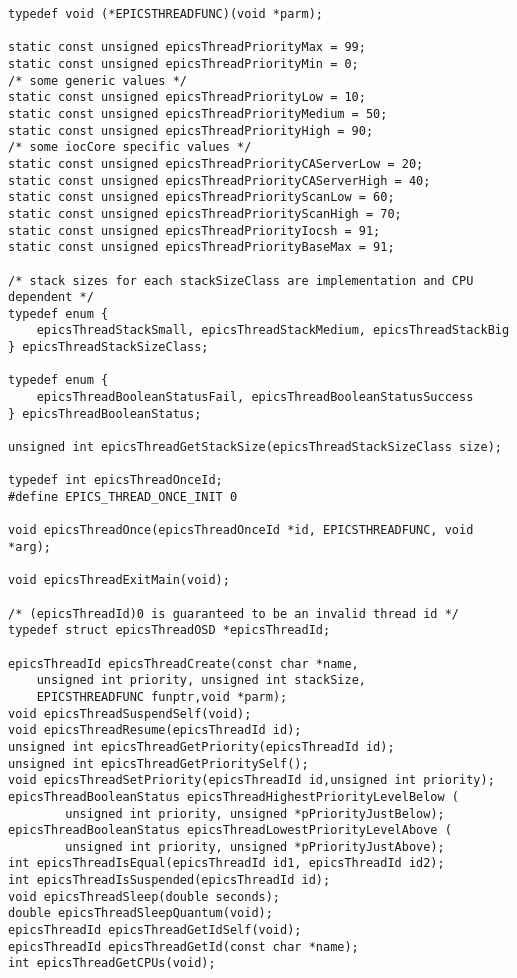 \begin{verbatim}
typedef void (*EPICSTHREADFUNC)(void *parm);

static const unsigned epicsThreadPriorityMax = 99;
static const unsigned epicsThreadPriorityMin = 0;
/* some generic values */
static const unsigned epicsThreadPriorityLow = 10;
static const unsigned epicsThreadPriorityMedium = 50;
static const unsigned epicsThreadPriorityHigh = 90;
/* some iocCore specific values */
static const unsigned epicsThreadPriorityCAServerLow = 20;
static const unsigned epicsThreadPriorityCAServerHigh = 40;
static const unsigned epicsThreadPriorityScanLow = 60;
static const unsigned epicsThreadPriorityScanHigh = 70;
static const unsigned epicsThreadPriorityIocsh = 91;
static const unsigned epicsThreadPriorityBaseMax = 91;

/* stack sizes for each stackSizeClass are implementation and CPU dependent */
typedef enum {
    epicsThreadStackSmall, epicsThreadStackMedium, epicsThreadStackBig
} epicsThreadStackSizeClass;

typedef enum {
    epicsThreadBooleanStatusFail, epicsThreadBooleanStatusSuccess
} epicsThreadBooleanStatus;

unsigned int epicsThreadGetStackSize(epicsThreadStackSizeClass size);

typedef int epicsThreadOnceId;
#define EPICS_THREAD_ONCE_INIT 0

void epicsThreadOnce(epicsThreadOnceId *id, EPICSTHREADFUNC, void *arg);

void epicsThreadExitMain(void);

/* (epicsThreadId)0 is guaranteed to be an invalid thread id */
typedef struct epicsThreadOSD *epicsThreadId;

epicsThreadId epicsThreadCreate(const char *name,
    unsigned int priority, unsigned int stackSize,
    EPICSTHREADFUNC funptr,void *parm);
void epicsThreadSuspendSelf(void);
void epicsThreadResume(epicsThreadId id);
unsigned int epicsThreadGetPriority(epicsThreadId id);
unsigned int epicsThreadGetPrioritySelf();
void epicsThreadSetPriority(epicsThreadId id,unsigned int priority);
epicsThreadBooleanStatus epicsThreadHighestPriorityLevelBelow (
        unsigned int priority, unsigned *pPriorityJustBelow);
epicsThreadBooleanStatus epicsThreadLowestPriorityLevelAbove (
        unsigned int priority, unsigned *pPriorityJustAbove);
int epicsThreadIsEqual(epicsThreadId id1, epicsThreadId id2);
int epicsThreadIsSuspended(epicsThreadId id);
void epicsThreadSleep(double seconds);
double epicsThreadSleepQuantum(void);
epicsThreadId epicsThreadGetIdSelf(void);
epicsThreadId epicsThreadGetId(const char *name);
int epicsThreadGetCPUs(void);


\end{verbatim}
